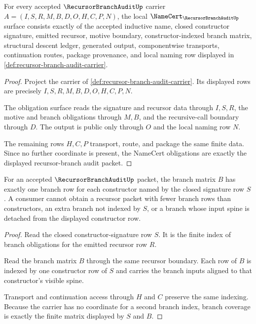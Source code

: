 \begin{theorem}
\label{thm:recursor-branch-audit-namecert-obligations}
For every accepted $\RecursorBranchAuditUp$ carrier $A=(I,S,R,M,B,D,O,H,C,P,N)$, the local $\NameCert_{\RecursorBranchAuditUp}$ surface consists exactly of the accepted inductive name, closed constructor signature, emitted recursor, motive boundary, constructor-indexed branch matrix, structural descent ledger, generated output, componentwise transports, continuation routes, package provenance, and local naming row displayed in \autoref{def:recursor-branch-audit-carrier}.
\end{theorem}
\begin{proof}
Project the carrier of \autoref{def:recursor-branch-audit-carrier}. Its displayed rows are precisely $I,S,R,M,B,D,O,H,C,P,N$.

The obligation surface reads the signature and recursor data through $I,S,R$, the motive and branch obligations through $M,B$, and the recursive-call boundary through $D$. The output is public only through $O$ and the local naming row $N$.

The remaining rows $H,C,P$ transport, route, and package the same finite data. Since no further coordinate is present, the NameCert obligations are exactly the displayed recursor-branch audit packet.
\end{proof}

\begin{theorem}
\label{thm:recursor-branch-audit-branch-coverage}
For an accepted $\RecursorBranchAuditUp$ packet, the branch matrix $B$ has exactly one branch row for each constructor named by the closed signature row $S$. A consumer cannot obtain a recursor packet with fewer branch rows than constructors, an extra branch not indexed by $S$, or a branch whose input spine is detached from the displayed constructor row.
\end{theorem}
\begin{proof}
Read the closed constructor-signature row $S$. It is the finite index of branch obligations for the emitted recursor row $R$.

Read the branch matrix $B$ through the same recursor boundary. Each row of $B$ is indexed by one constructor row of $S$ and carries the branch inputs aligned to that constructor's visible spine.

Transport and continuation access through $H$ and $C$ preserve the same indexing. Because the carrier has no coordinate for a second branch index, branch coverage is exactly the finite matrix displayed by $S$ and $B$.
\end{proof}

